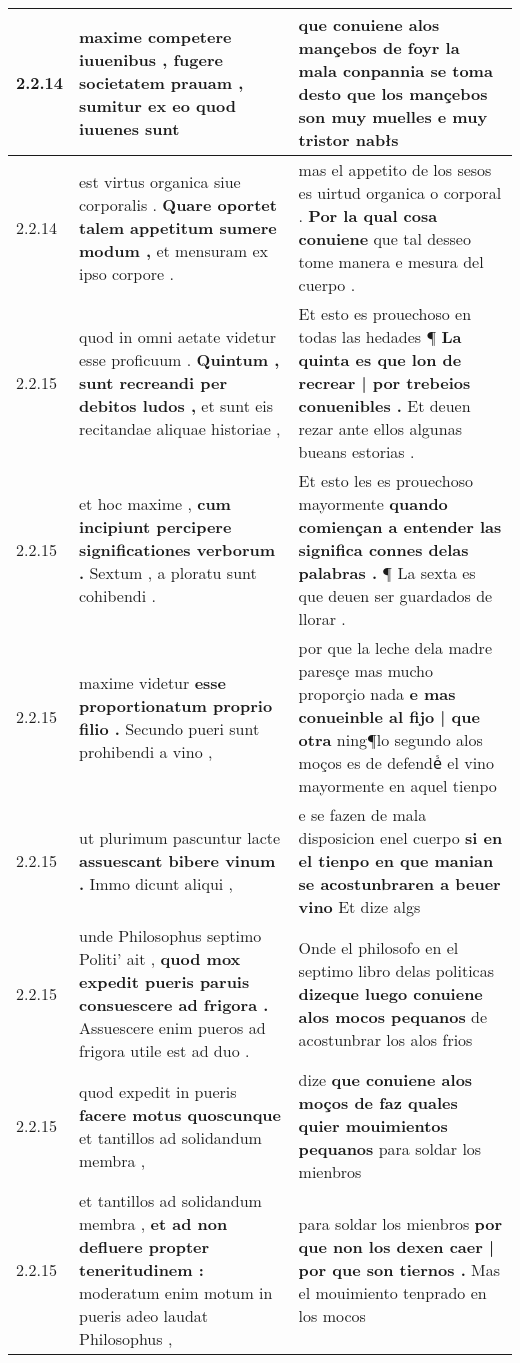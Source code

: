 \begin{tabular}{|p{1cm}|p{6.5cm}|p{6.5cm}|}
2.2.14 & maxime competere iuuenibus , \textbf{ fugere societatem prauam , } sumitur ex eo quod iuuenes sunt & que conuiene alos mançebos de foyr \textbf{ la mala conpannia se toma desto que los mançebos son muy muelles } e muy tristor nabłs \\\hline
2.2.14 & est virtus organica siue corporalis . \textbf{ Quare oportet talem appetitum sumere modum , } et mensuram ex ipso corpore . & mas el appetito de los sesos es uirtud organica o corporal . \textbf{ Por la qual cosa conuiene } que tal desseo tome manera e mesura del cuerpo . \\\hline
2.2.15 & quod in omni aetate videtur esse proficuum . \textbf{ Quintum , sunt recreandi per debitos ludos , } et sunt eis recitandae aliquae historiae , & Et esto es prouechoso en todas las hedades ¶ \textbf{ La quinta es que lon de recrear | por trebeios conuenibles . } Et deuen rezar ante ellos algunas bueans estorias . \\\hline
2.2.15 & et hoc maxime , \textbf{ cum incipiunt percipere significationes verborum . } Sextum , a ploratu sunt cohibendi . & Et esto les es prouechoso mayormente \textbf{ quando comiençan a entender las significa connes delas palabras . } ¶ La sexta es que deuen ser guardados de llorar . \\\hline
2.2.15 & maxime videtur \textbf{ esse proportionatum proprio filio . } Secundo pueri sunt prohibendi a vino , & por que la leche dela madre paresçe mas mucho proporçio nada \textbf{ e mas conueinble al fijo | que otra } ning¶lo segundo alos moços es de defendeᷤ el vino mayormente en aquel tienpo \\\hline
2.2.15 & ut plurimum pascuntur lacte \textbf{ assuescant bibere vinum . } Immo dicunt aliqui , & e se fazen de mala disposicion enel cuerpo \textbf{ si en el tienpo en que manian se acostunbraren a beuer vino } Et dize algs \\\hline
2.2.15 & unde Philosophus septimo Politi’ ait , \textbf{ quod mox expedit pueris paruis consuescere ad frigora . } Assuescere enim pueros ad frigora utile est ad duo . & Onde el philosofo en el septimo libro delas politicas \textbf{ dizeque luego conuiene alos mocos pequanos } de acostunbrar los alos frios \\\hline
2.2.15 & quod expedit in pueris \textbf{ facere motus quoscunque } et tantillos ad solidandum membra , & dize \textbf{ que conuiene alos moços de faz quales quier mouimientos pequanos } para soldar los mienbros \\\hline
2.2.15 & et tantillos ad solidandum membra , \textbf{ et ad non defluere propter teneritudinem : } moderatum enim motum in pueris adeo laudat Philosophus , & para soldar los mienbros \textbf{ por que non los dexen caer | por que son tiernos . } Mas el mouimiento tenprado en los mocos \\\hline

\end{tabular}
